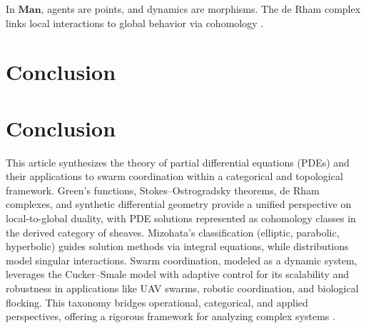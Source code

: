 \documentclass{article}
\theoremstyle{plain}
\newcommand{\cat}[1]{\mathbf{#1}}
\begin{document}
In \(\cat{Man}\), agents are points, and dynamics are morphisms. The de Rham complex links local interactions to global behavior via cohomology \cite{nLab_de_Rham_theorem}.

\section{Conclusion}

\section{Conclusion}
This article synthesizes the theory of partial differential equations (PDEs)
and their applications to swarm coordination within a categorical and topological framework.
Green's functions, Stokes--Ostrogradsky theorems, de Rham complexes, and synthetic
differential geometry provide a unified perspective on local-to-global duality,
with PDE solutions represented as cohomology classes in the derived category of sheaves.
Mizohata’s classification (elliptic, parabolic, hyperbolic) guides solution methods via
integral equations, while distributions model singular interactions. Swarm coordination,
modeled as a dynamic system, leverages the Cucker--Smale model with adaptive control for
its scalability and robustness in applications like UAV swarms, robotic coordination,
and biological flocking. This taxonomy bridges operational, categorical, and applied
perspectives, offering a rigorous framework for analyzing complex systems \cite{nLab_synthetic_diff_geom, nLab_de_Rham_theorem}.
\end{document}
